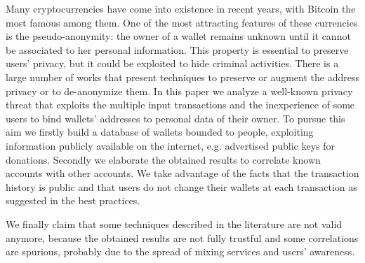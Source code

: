 Many cryptocurrencies have come into existence in recent years, with Bitcoin
the most famous among them. One of the most attracting features of these
currencies is the pseudo-anonymity: the owner of a wallet remains unknown until
it cannot be associated to her personal information.
This property is essential to preserve users' privacy, but it could be
exploited to hide criminal activities. There is a large number of works that
present techniques to preserve or augment the address privacy or to
de-anonymize them.
In this paper we analyze a well-known privacy threat that exploits the multiple
input transactions and the inexperience of some users to bind wallets’
addresses to personal data of their owner.
To pursue this aim we firstly build a database of wallets bounded
to people, exploiting information publicly available on the internet, e.g.
advertised public keys for donations.
Secondly we elaborate the obtained results to correlate known accounts with
other accounts. We take advantage of
the facts that the transaction history is public and that users do not change
their wallets at each transaction as suggested in the best practices.

We finally claim that some techniques described in the literature are not
valid anymore, because the obtained results are not fully trustful and some
correlations are spurious, probably due to the spread of mixing services and
users' awareness.
